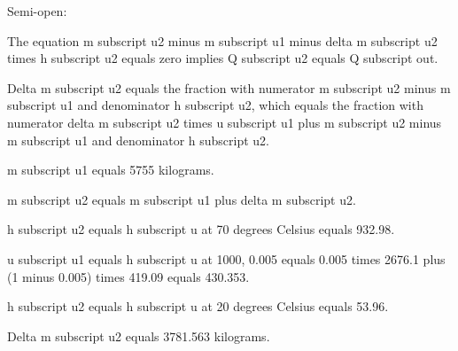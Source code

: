 Semi-open:

The equation m subscript u2 minus m subscript u1 minus delta m subscript u2 times h subscript u2 equals zero implies Q subscript u2 equals Q subscript out.

Delta m subscript u2 equals the fraction with numerator m subscript u2 minus m subscript u1 and denominator h subscript u2, which equals the fraction with numerator delta m subscript u2 times u subscript u1 plus m subscript u2 minus m subscript u1 and denominator h subscript u2.

m subscript u1 equals 5755 kilograms.

m subscript u2 equals m subscript u1 plus delta m subscript u2.

h subscript u2 equals h subscript u at 70 degrees Celsius equals 932.98.

u subscript u1 equals h subscript u at 1000, 0.005 equals 0.005 times 2676.1 plus (1 minus 0.005) times 419.09 equals 430.353.

h subscript u2 equals h subscript u at 20 degrees Celsius equals 53.96.

Delta m subscript u2 equals 3781.563 kilograms.